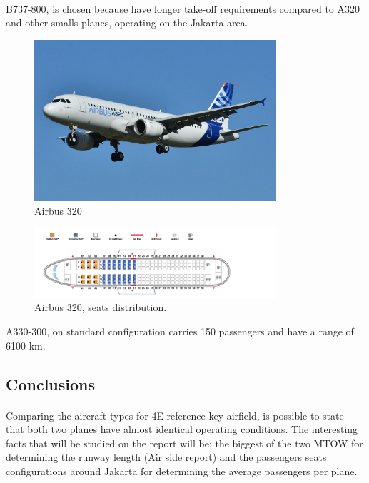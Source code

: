 	\paragraph{} B737-800, is chosen because have longer take-off requirements compared to A320 and other smalls planes, operating on the Jakarta area.
	\begin{figure}[H]
		\centering
		\includegraphics[clip, trim=0cm 0cm 0cm 0cm, width=0.8\textwidth]{./images/PROGNOSIS/aircraft/a320}
		\caption{Airbus 320}
		\label{a320}
	\end{figure}
	\begin{figure}[H]
		\centering
		\includegraphics[clip, trim=0cm 0cm 0cm 0cm, width=0.8\textwidth]{./images/PROGNOSIS/aircraft/a320seats}
		\caption{Airbus 320, seats distribution.}
		\label{a320seats}
	\end{figure}

	A330-300, on standard configuration carries 150 passengers and have a range of 6100 km.
	
	\subsection{Conclusions}
	\paragraph{} Comparing the aircraft types for 4E reference key airfield, is possible to state that both two planes have almost identical operating conditions. The interesting facts that will be studied on the report will be: the biggest of the two MTOW for determining the runway length (Air side report) and the passengers seats configurations around Jakarta for determining the average passengers per plane.
	
